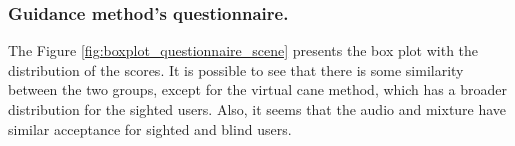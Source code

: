 \subsubsection{Guidance method's questionnaire.}
\label{subsubsec:results_questionnaires_2}


%


The Figure \ref{fig:boxplot_questionnaire_scene} presents the box plot with the distribution of the scores. It is possible to see that there is some similarity between the two groups, except for the virtual cane method, which has a broader distribution for the sighted users. Also, it seems that the audio and mixture have similar acceptance for sighted and blind users.

